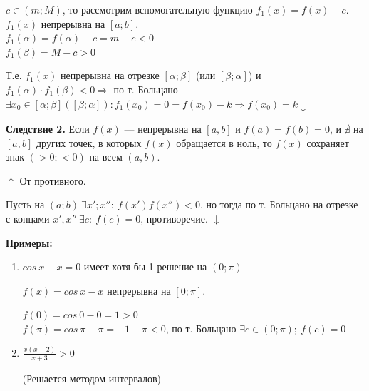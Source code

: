 \documentclass{article}
\begin{document}
    \( c \in (m; M) \), то рассмотрим вспомогательную функцию \( f_1(x) = f(x) - c \). \( f_1(x) \) непрерывна на \( [a; b] \).\\
    \( f_1(\alpha) = f(\alpha) - c = m - c < 0 \)\\
    \( f_1(\beta) = M - c > 0 \)

    Т.е. \(f_1(x)\) непрерывна на отрезке \( [\alpha; \beta] \) (или \( [\beta; \alpha] \)) и \( f_1(\alpha) \cdot f_1(\beta) < 0 \Rightarrow \) по т. Больцано \( \exists x_0 \in [\alpha; \beta]([\beta; \alpha]): f_1(x_0) = 0 = f(x_0) - k \Rightarrow f(x_0) = k \downarrow \)

    \textbf{Следствие 2.} Если \( f(x) \) --- непрерывна на \( [a, b] \) и \( f(a) = f(b) = 0 \), и \(\nexists\) на \( [a, b] \) других точек, в которых \( f(x) \) обращается в ноль, то \( f(x) \) сохраняет знак \( (>0; <0) \) на всем \( (a, b) \).

    \(\uparrow\) От противного.

    Пусть на \((a; b)\ \exists x'; x'' :\ f(x')f(x'') < 0\), но тогда по т. Больцано на отрезке с концами \(x', x''\ \exists c:\ f(c)=0\), противоречие. \(\downarrow\)

    \textbf{Примеры:}

    \begin{enumerate}
        \item \(cos\ x - x = 0\) имеет хотя бы 1 решение на \((0; \pi)\)

        \(f(x) = cos\ x - x\) непрерывна на \([0; \pi]\).
    
        \(f(0) = cos\ 0 - 0 = 1 > 0\)\\
        \(f(\pi) = cos\ \pi - \pi = -1-\pi < 0\), по т. Больцано \(\exists c \in (0; \pi);\ f(c)=0\)

        \item \( \frac{x(x - 2)}{x + 3} > 0 \)

        (Решается методом интервалов)
    \end{enumerate}
    
\end{document}
